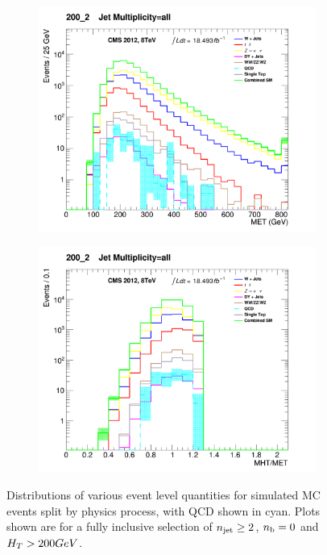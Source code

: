 \begin{figure}[h!]
  \begin{subfigure}[b]{0.46\textwidth}
    \includegraphics[width=\textwidth]
    {Figs/datamc/had/qcd/MET_all_200_upwards.png}
    \caption{\met}
    \label{fig:had_qcd_mc_met}
  \end{subfigure}
  \begin{subfigure}[b]{0.46\textwidth}
    \includegraphics[width=\textwidth]
    {Figs/datamc/had/qcd/MHTovMET_all_200_upwards.png}
    \caption{\mhtmet}
    \label{fig:had_qcd_mc_MHTMET}
  \end{subfigure}
  \caption{Distributions of various event level quantities for simulated MC
  events split by physics process, with QCD shown in cyan. Plots shown are for
  a fully inclusive selection of $n_{\text{jet}}\geq2$, $n_{\text{b}}=0$ and $H_T>200GeV$.}
  \label{fig:had_qcd_mc_distros}
\end{figure}

